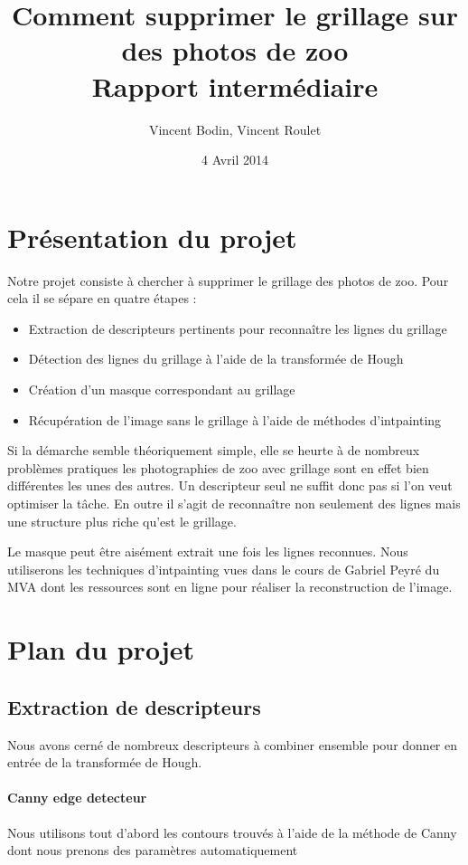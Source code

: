 \documentclass[10pt,a4paper]{article}
\title{Comment supprimer le grillage sur des photos de zoo\\ Rapport intermédiaire}
\author{Vincent Bodin, Vincent Roulet}
\date{4 Avril 2014}
\begin{document}
\maketitle

\section{Présentation du projet}
Notre projet consiste à chercher à supprimer le grillage des photos de zoo. Pour cela il se sépare en quatre étapes :
\begin{itemize}
\item Extraction de descripteurs pertinents pour reconnaître les lignes du grillage
\item Détection des lignes du grillage à l'aide de la transformée de Hough
\item Création d'un masque correspondant au grillage
\item Récupération de l'image sans le grillage à l'aide de méthodes d'intpainting
\end{itemize}

Si la démarche semble théoriquement simple, elle se heurte à de nombreux problèmes pratiques les photographies de zoo avec grillage sont en effet bien différentes les unes des autres. Un descripteur seul ne suffit donc pas si l'on veut optimiser la tâche. En outre il s'agit de reconnaître non seulement des lignes mais une structure plus riche qu'est le grillage.

Le masque peut être aisément extrait une fois les lignes reconnues. Nous utiliserons les techniques d'intpainting vues dans le cours de Gabriel Peyré du MVA dont les ressources sont en ligne pour réaliser la reconstruction de l'image.

\section{Plan du projet}
\subsection{Extraction de descripteurs}
Nous avons cerné de nombreux descripteurs à combiner ensemble pour donner en entrée de la transformée de Hough.

\paragraph{Canny edge detecteur}
Nous utilisons tout d'abord les contours trouvés à l'aide de la méthode de Canny dont nous prenons des paramètres automatiquement
\end{document}
